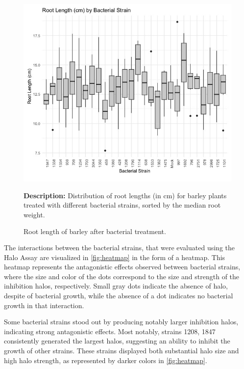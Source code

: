 \begin{figure}[H]
    \centering
    \includegraphics[width=0.8\linewidth]{Figures/RootLength.jpeg}
    \caption{Root length of barley after bacterial treatment.}
    \medskip
    \textbf{Description:} Distribution of root lengths (in cm) for barley plants treated with different bacterial strains, sorted by the median root weight.
    \label{fig:root_length_boxplot}
\end{figure}


The interactions between the bacterial strains, that were evaluated using the Halo Assay are visualized in \autoref{fig:heatmap} in the form of a heatmap. 
This heatmap represents the antagonistic effects observed between bacterial strains, where the size and color of the dots correspond to the size and strength of the inhibition halos, respectively. Small gray dots indicate the absence of halo, despite of bacterial growth, while the absence of a dot indicates no bacterial growth in that interaction. 

Some bacterial strains stood out by producing notably larger inhibition halos, indicating strong antagonistic effects. Most notably, strains 1208, 1847 consistently generated the largest halos, suggesting an ability to inhibit the growth of other strains. These strains displayed both substantial halo size and high halo strength, as represented by darker colors in \autoref{fig:heatmap}.

